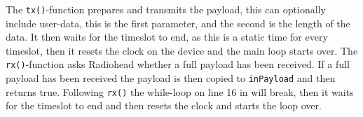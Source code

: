 The \texttt{tx()}-function prepares and transmits the payload, this can optionally include user-data, this is the first parameter, and the second is the length of the data.
It then waits for the timeslot to end, as this is a static time for every timeslot, then it resets the clock on the device and the main loop starts over.
The \texttt{rx()}-function asks Radiohead whether a full payload has been received. 
If a full payload has been received the payload is then copied to \texttt{inPayload} and then returns true.
Following \texttt{rx()} the while-loop on line 16 in  will break, then it waits for the timeslot to end and then resets the clock and starts the loop over. 